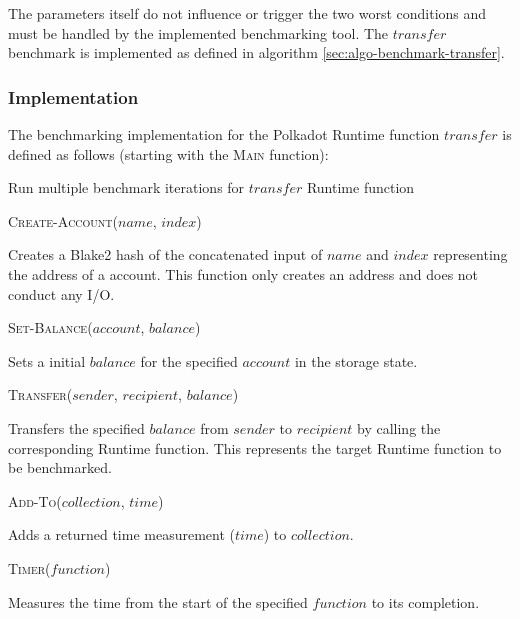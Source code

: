 \documentclass[11pt,a4paper]{article}
\newcommand{\SubItem}[1]{
    {\setlength\itemindent{15pt} \item[-] #1}
}
\begin{document}
The parameters itself do not influence or trigger the two worst conditions and must be handled by
the implemented benchmarking tool. The $transfer$ benchmark is implemented as defined in algorithm
\ref{sec:algo-benchmark-transfer}.

\subsubsection*{Implementation}
The benchmarking implementation for the Polkadot Runtime function $transfer$ is defined as
follows (starting with the \textsc{Main} function):
\newline


\begin{algorithm}[H]\label{sec:algo-benchmark-transfer}
  \caption{Run multiple benchmark iterations for $transfer$ Runtime function}
  \SetAlgoLined
  \BlankLine
  \BlankLine
\end{algorithm}

\begin{itemize}
  \item \textsc{Create-Account($name$, $index$)}
      \SubItem{Creates a Blake2 hash of the concatenated input of $name$ and $index$ representing
      the address of a account. This function only creates an address and does not conduct any I/O.}
  \item \textsc{Set-Balance($account$, $balance$)}
      \SubItem{Sets a initial $balance$ for the specified $account$ in the storage state.}
  \item \textsc{Transfer($sender$, $recipient$, $balance$)}
      \SubItem{Transfers the specified $balance$ from $sender$ to $recipient$ by calling the
      corresponding Runtime function. This represents the target Runtime function to be benchmarked.}
  \item \textsc{Add-To($collection$, $time$)}
      \SubItem{Adds a returned time measurement ($time$) to $collection$.}
  \item \textsc{Timer($function$)}
      \SubItem{Measures the time from the start of the specified $function$ to its completion.}
\end{itemize}
\end{document}
